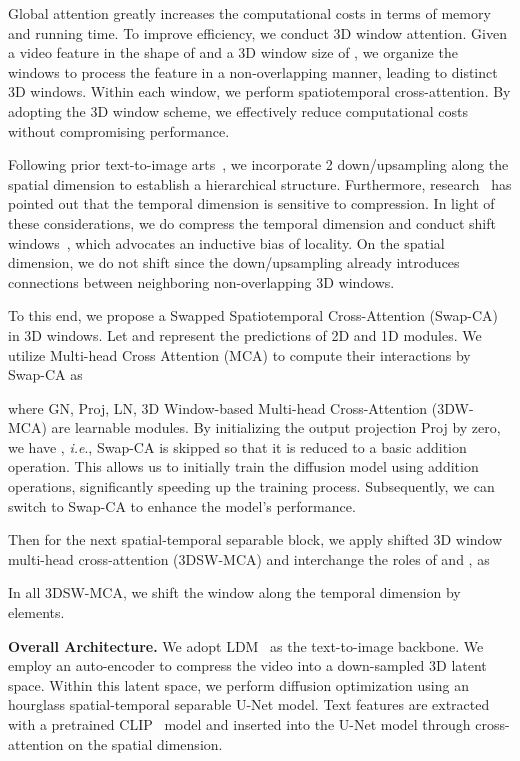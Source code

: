 \documentclass{article}
\def\ie{\emph{i.e}.} \def\Ie{\emph{I.e}.}
\begin{document}
Global attention greatly increases the computational costs in terms of memory and running time. 
To improve efficiency, we conduct 3D window attention.
Given a video feature in the shape of  and a 3D window size of , we organize the windows to process the feature in a non-overlapping manner, leading to  distinct 3D windows.
Within each window, we perform spatiotemporal cross-attention. By adopting the 3D window scheme, we effectively reduce computational costs without compromising performance.



Following prior text-to-image arts~\cite{VideoLDM, 2022LDM}, we incorporate 2 down/upsampling along the spatial dimension to establish a hierarchical structure.
Furthermore, research~\cite{2019VideoCompression,2020VideoCompression} has pointed out that the temporal dimension is sensitive to compression.
In light of these considerations, we do compress the temporal dimension and conduct shift windows~\cite{2022VideoSwin}, which advocates an inductive bias of locality.
On the spatial dimension, we do not shift since the down/upsampling already introduces connections between neighboring non-overlapping 3D windows.



To this end, we propose a Swapped Spatiotemporal Cross-Attention (Swap-CA) in 3D windows.
Let  and  represent the predictions of 2D and 1D modules. We utilize Multi-head Cross Attention (MCA) to compute their interactions by Swap-CA as

where GN, Proj, LN, 3D Window-based Multi-head Cross-Attention (3DW-MCA) are learnable modules.
By initializing the output projection Proj by zero, we have , \ie, Swap-CA is skipped so that it is reduced to a basic addition operation.
This allows us to initially train the diffusion model using addition operations, significantly speeding up the training process.
Subsequently, we can switch to Swap-CA to enhance the model's performance.

Then for the next spatial-temporal separable block, we apply shifted 3D window multi-head cross-attention (3DSW-MCA) and interchange the roles of  and , as

In all 3DSW-MCA, we shift the window along the temporal dimension by  elements.

\noindent\textbf{Overall Architecture.}
We adopt LDM~\cite{2022LDM} as the text-to-image backbone.
We employ an auto-encoder to compress the video into a down-sampled 3D latent space.
Within this latent space, we perform diffusion optimization using an hourglass spatial-temporal separable U-Net model.
Text features are extracted with a pretrained CLIP~\cite{CLIP} model and inserted into the U-Net model through cross-attention on the spatial dimension.
\end{document}
